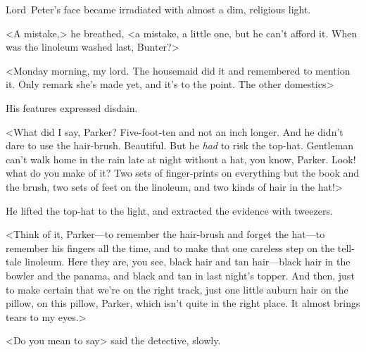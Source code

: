 Lord~Peter's face became irradiated with almost a dim, religious light.

<A mistake,> he breathed, <a mistake, a little one, but he can't afford it. When was the linoleum washed last, Bunter?>

<Monday morning, my lord. The housemaid did it and remembered to mention it. Only remark she's made yet, and it's to the point. The other domestics\longdash>

His features expressed disdain.

<What did I say, Parker? Five-foot-ten and not an inch longer. And he didn't dare to use the hair-brush. Beautiful. But he \textit{had} to risk the top-hat. Gentleman can't walk home in the rain late at night without a hat, you know, Parker. Look! what do you make of it? Two sets of finger-prints on everything but the book and the brush, two sets of feet on the linoleum, and two kinds of hair in the hat!>

He lifted the top-hat to the light, and extracted the evidence with tweezers.

<Think of it, Parker—to remember the hair-brush and forget the hat—to remember his fingers all the time, and to make that one careless step on the tell-tale linoleum. Here they are, you see, black hair and tan hair—black hair in the bowler and the panama, and black and tan in last night's topper. And then, just to make certain that we're on the right track, just one little auburn hair on the pillow, on this pillow, Parker, which isn't quite in the right place. It almost brings tears to my eyes.>

<Do you mean to say\longdash> said the detective, slowly.

